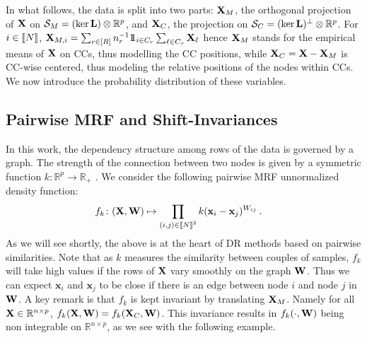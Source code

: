 In what follows, the data is split into two parts: $\mathbf{X}_{M}$, the orthogonal projection of $\mathbf{X}$ on $\mathcal{S}_{M} = (\ker \mathbf{L}) \otimes \mathbb{R}^p$, and $\mathbf{X}_{C}$, the projection on $\mathcal{S}_{C} = (\ker \mathbf{L})^{\perp} \otimes \mathbb{R}^p$. For $i \in {[\![N]\!]}$, $\mathbf{X}_{M,i} = \sum_{r \in [R]} n_r^{-1} 1\!\!1_{i \in C_r}\sum_{\ell \in C_r} \mathbf{X}_{\ell} $ hence $\mathbf{X}_{M}$ stands for the empirical means of $\mathbf{X}$ on CCs, thus modelling the CC positions, while $\mathbf{X}_{C} = \mathbf{X} - \mathbf{X}_{M}$ is CC-wise centered, thus modeling the relative positions of the nodes within CCs. We now introduce the probability distribution of these variables.

\subsection{Pairwise MRF and Shift-Invariances}\label{sec:within_CC}

In this work, the dependency structure among rows of the data is governed by a graph. The strength of the connection between two nodes is given by a symmetric function $k: \mathbb{R}^p \to \mathbb{R}_+$ . We consider the following pairwise MRF unnormalized density function:
\begin{align}\label{eq:unnormalized_MRF}
  f_{k} \colon (\mathbf{X},{\mathbf{W}}) &\mapsto \prod_{(i,j) \in {[\![N]\!]}^2} k(\mathbf{x}_{i} - \mathbf{x}_{j})^{W_{ij}} \: .
\end{align}
As we will see shortly, the above is at the heart of DR methods based on pairwise similarities. Note that as $k$ measures the similarity between couples of samples, $f_k$ will take high values if the rows of $\mathbf{X}$ vary smoothly on the graph ${\mathbf{W}}$. Thus we can expect $\mathbf{x}_i$ and $\mathbf{x}_j$ to be close if there is an edge between node $i$ and node $j$ in ${\mathbf{W}}$. A key remark is that $f_{k}$ is kept invariant by translating $\mathbf{X}_{M}$. Namely for all $\mathbf{X} \in \mathbb{R}^{n \times p}$, $f_{k}(\mathbf{X}, {\mathbf{W}}) = f_{k}(\mathbf{X}_{C}, {\mathbf{W}})$. This invariance results in $f_{k}(\cdot, {\mathbf{W}})$ being non integrable on $\mathbb{R}^{n \times p}$, as we see with the following example. 

